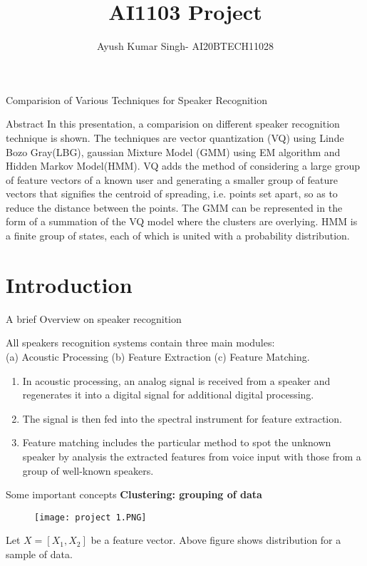 \documentclass{beamer}
\title{AI1103 Project}
\author{Ayush Kumar Singh- AI20BTECH11028}
\date{}
\begin{document}
\begin{frame}
\titlepage
\end{frame}
\section{}
\begin{frame}{Comparision of Various Techniques for Speaker Recognition }
\begin{block}{Abstract}
In this presentation, a comparision on different speaker recognition technique is shown. The techniques are vector quantization (VQ) using Linde Bozo Gray(LBG), gaussian Mixture Model (GMM) using EM algorithm and Hidden Markov Model(HMM).
VQ adds the method of considering a large group of feature vectors of a known user and generating a smaller group of feature vectors that signifies the centroid of spreading, i.e. points set apart, so as to reduce the distance between the points. The GMM can be represented in the form of a summation of the VQ model where the clusters are overlying. HMM is a finite group of states, each of which is
united with a probability distribution.
\end{block}
\end{frame}
\section{Introduction}
\begin{frame}{A brief Overview on speaker recognition}
\begin{block}
 

All speakers recognition systems contain three main
modules: \\
(a) Acoustic Processing (b) Feature Extraction (c)
Feature Matching.\\
\begin{enumerate}
\item In acoustic processing, an analog signal is received from a speaker and regenerates it into a digital signal for additional
digital processing. 
\item The signal is then fed into the spectral
instrument for feature extraction.
\item Feature matching includes the particular method to spot the
unknown speaker by analysis the extracted features from voice
input with those from a group of well-known speakers.
\end{enumerate}
\end{block}

\end{frame}
\begin{frame}{Some important concepts}
\textbf{Clustering: grouping of data}\\
\begin{figure}
    \centering
    \texttt{[image: project 1.PNG]}
    
    
\end{figure}
Let $X= [X_{1}, X_{2}]$ be a feature vector. Above figure shows distribution for a sample of data.
\end{frame}
\end{document}
